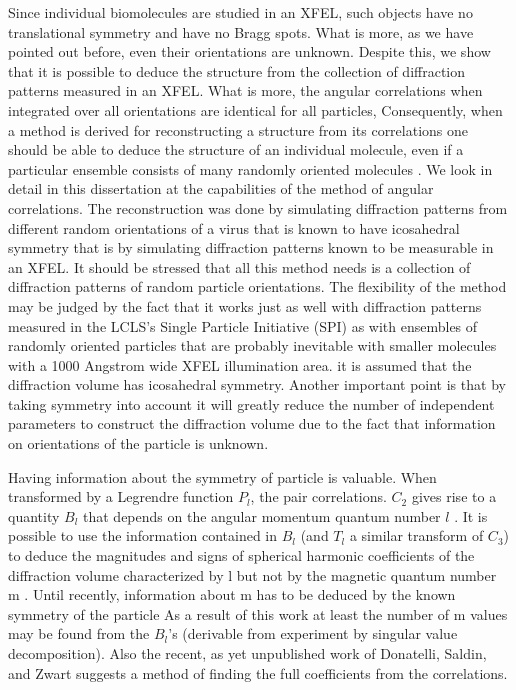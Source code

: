 Since individual biomolecules are studied in an XFEL, such objects have no translational symmetry and have no Bragg spots. What is more, as we have pointed out before, even their orientations are unknown. Despite this, we show that it is possible to deduce the structure from the collection of diffraction patterns measured in an XFEL. What is more, the angular correlations when integrated over all orientations are identical for all particles, Consequently, when a method is derived for reconstructing a structure from its correlations one should be able to deduce the structure of an individual molecule, even if a particular ensemble consists of many randomly oriented molecules \cite{kam1978}. We look in detail in this dissertation at the capabilities of the method of angular correlations. The reconstruction was done by simulating diffraction patterns from different random orientations of a virus that is known to have icosahedral symmetry \cite{saldinvirus} that is by simulating diffraction patterns known to be measurable in an XFEL. It should be stressed that all this method needs is a collection of diffraction patterns of random particle orientations. The flexibility of the method may be judged by the fact that it works just as well with diffraction patterns measured in the LCLS’s Single Particle Initiative (SPI) \cite{Munke} as with ensembles of randomly oriented particles that are probably inevitable with smaller molecules with a 1000 Angstrom wide XFEL illumination area. it is assumed that the diffraction volume has icosahedral symmetry. Another important point is that by taking symmetry into account it will greatly reduce the number of independent parameters to construct the diffraction volume due to the fact that information on orientations of the particle is unknown. 

Having information about the symmetry of particle is valuable. When transformed by a Legrendre function  $P_{l}$, the pair correlations. $C_{2}$ gives rise to a quantity $B_l$ that depends on the angular momentum quantum number $l$ \cite{PoonFiber}. It is possible to use the information contained in $B_{l}$ (and $T_{l}$ a similar transform of $C_3$) to deduce the magnitudes and signs of spherical harmonic coefficients of the diffraction volume characterized by l but not by the magnetic quantum number m \cite{Casper}. Until recently, information about m has to be deduced by the known symmetry of the particle As a result of this work at least the number of m values may be found from the $B_l$'s (derivable from experiment by singular value decomposition). Also the recent, as yet unpublished work of Donatelli, Saldin, and Zwart suggests a method of finding the full \Ilm coefficients from the correlations.

